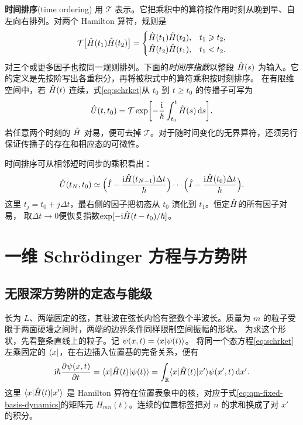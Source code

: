 \textbf{时间排序}(time ordering) 用 $\mathcal T$ 表示。它把乘积中的算符按作用时刻从晚到早、自左向右排列。对两个 Hamilton 算符，规则是
\begin{equation}
    \mathcal T\bigl[\hat{H}(t_1)\hat{H}(t_2)\bigr] =
    \begin{cases}
        \hat{H}(t_1)\hat{H}(t_2), & t_1 \geqslant t_2,\\
        \hat{H}(t_2)\hat{H}(t_1), & t_1 < t_2.
    \end{cases}
\end{equation}
对三个或更多因子也按同一规则排列。下面的\emph{时间序指数}以整段 $\hat{H}(s)$ 为输入。它的定义是先按阶写出各重积分，再将被积式中的算符乘积按时刻排序。
在有限维空间中，若 $\hat{H}(t)$ 连续，式\eqref{eq:schrket}从 $t_0$ 到 $t \ge t_0$ 的传播子可写为
\begin{equation}
    \hat{U}(t,t_0) = \mathcal T\exp\biggl[-\frac{\mathrm{i}}\hbar\int_{t_0}^t\hat{H}(s)\mathop{}\!\mathrm{d} s\biggr].
\end{equation}
若任意两个时刻的 $\hat{H}$ 对易，便可去掉 $\mathcal T$。对于随时间变化的无界算符，还须另行保证传播子的存在和相应态的可微性。

时间排序可从相邻短时间步的乘积看出：
\begin{equation}
    \hat{U}(t_N,t_0)
    \simeq
    \Bigl(\hat{I} - \frac{\mathrm{i} \hat{H}(t_{N-1})\Delta t}{\hbar}\Bigr)
    \cdots
    \Bigl(\hat{I} - \frac{\mathrm{i} \hat{H}(t_0)\Delta t}{\hbar}\Bigr).
\end{equation}
这里 $t_j = t_0 + j\Delta t$，最右侧的因子把初态从 $t_0$ 演化到 $t_1$。恒定$\hat{H}$的所有因子对易，
取$\Delta t \to 0$便恢复指数$\exp[-\mathrm{i} \hat{H}(t - t_0)/\hbar]$。

\section{一维 Schrödinger 方程与方势阱}
\subsection{无限深方势阱的定态与能级}
\label{ss:position-well}
长为 $L$、两端固定的弦，其驻波在弦长内恰有整数个半波长。质量为 $m$ 的粒子受限于两面硬墙之间时，两端的边界条件同样限制空间振幅的形状。
为求这个形状，先看整条直线上的粒子。记 $\psi(x,t) = \langle x\vert\psi(t)\rangle$。
将同一个态方程\eqref{eq:schrket}左乘固定的 $\langle x\rvert$，在右边插入位置基的完备关系，便有
\begin{equation}\label{eq:qm-position-kernel-dynamics}
    \mathrm{i}\hbar\frac{\partial^{}\psi(x,t)}{\partial{t}^{}}
    = \langle x\vert\hat{H}(t)\vert\psi(t)\rangle
    = \int_{\mathbb{R}} \langle x\vert\hat{H}(t)\vert x'\rangle\psi(x',t)\mathop{}\!\mathrm{d} x'.
\end{equation}
这里 $\langle x\vert\hat{H}(t)\vert x'\rangle$ 是 Hamilton 算符在位置表象中的核，对应于式\eqref{eq:qm-fixed-basis-dynamics}的矩阵元 $H_{mn}(t)$。连续的位置标签把对 $n$ 的求和换成了对 $x'$ 的积分。

